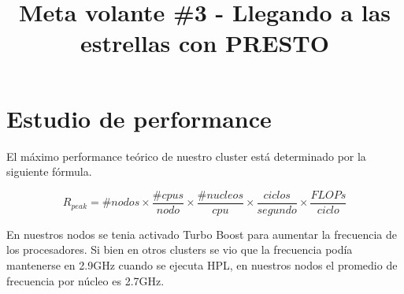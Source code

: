 \documentclass[conference,compsoc]{IEEEtran}
\begin{document}
\title{Meta volante \#3 - Llegando a las estrellas con PRESTO}

\author{
}


\maketitle
\IEEEdisplaynontitleabstractindextext



\section{Estudio de performance}

El máximo performance teórico de nuestro cluster está determinado por la siguiente fórmula. 

\begin{equation} \label{eq:1}
	R_{peak} = \#nodos \times \frac{\#cpus}{nodo} \times \frac{\#nucleos}{cpu} \times \frac{ciclos}{segundo} \times \frac{FLOPs}{ciclo} 
\end{equation}

En nuestros nodos se tenia activado Turbo Boost para aumentar la frecuencia de los procesadores. Si bien en otros clusters se vio que la frecuencia podía mantenerse en 2.9GHz cuando se ejecuta HPL, en nuestros nodos el promedio de frecuencia por núcleo es 2.7GHz.
\end{document}
